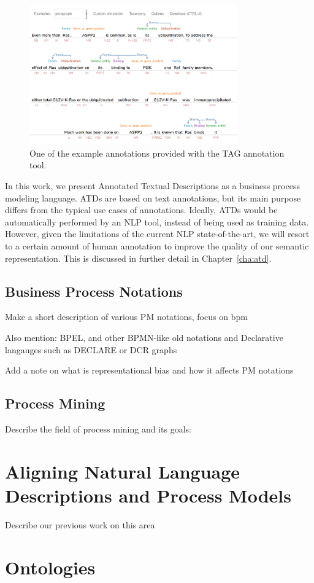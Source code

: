\begin{figure}[htb]
  \centering
  \includegraphics[width=0.8\textwidth]{figures/tag}
  \caption{One of the example annotations provided with the TAG
    annotation tool.}
  \label{fig:tag}
\end{figure}

In this work, we present Annotated Textual Descriptions as a business process
modeling language. ATDs are based on text annotations, but its main purpose
differs from the typical use cases of annotations. Ideally, ATDs would be
automatically performed by an NLP tool, instead of being used as training data.
However, given the limitations of the current NLP state-of-the-art, we will
resort to a certain amount of human annotation to improve the quality of our
semantic representation. This is discussed in further detail in Chapter~\ref{cha:atd}.


\subsection{Business Process Notations}

Make a short description of various PM notations, focus on bpm

Also mention: BPEL, and other BPMN-like old notations and Declarative langauges such as DECLARE or DCR graphs

Add a note on what is representational bias and how it affects PM notations

\subsection{Process Mining}

Describe the field of process mining and its goals:

\section{Aligning Natural Language Descriptions and Process Models}
\label{sec:background_alignments}

Describe our previous work on this area

\section{Ontologies}
\label{sec:background_ontologies}

